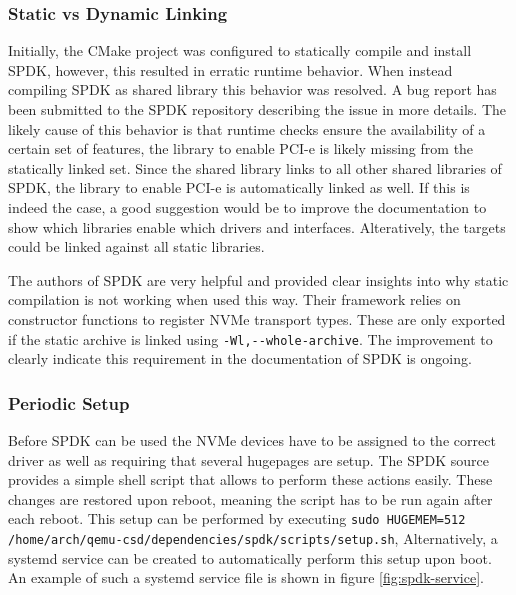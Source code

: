 \documentclass[conference]{IEEEtran}
\newcommand\bashstyle{
	\lstset{
		language=Bash,
		basicstyle=\ttm,
		showstringspaces=false,
		tabsize=2,
		aboveskip=0.2cm,
		belowskip=0.2cm,
		prebreak=\textbackslash,
		extendedchars=true,
		mathescape=false,
		linewidth=8.85cm,
		breaklines=true
	}
}
\newcommand\bashinline[1]{{\bashstyle\lstinline!#1!}}
\begin{document}

\subsubsection{Static vs Dynamic Linking}

Initially, the CMake project was configured to statically compile and install
SPDK, however, this resulted in erratic runtime behavior. When instead compiling
SPDK as shared library this behavior was resolved. A bug report has been
submitted to the SPDK repository describing the issue in more
details\cite{spdk-bug}. The likely cause of this behavior is that runtime checks
ensure the availability of a certain set of features, the library to enable
PCI-e is likely missing from the statically linked set. Since the shared
library links to all other shared libraries of SPDK, the library to enable
PCI-e is automatically linked as well. If this is indeed the case, a good
suggestion would be to improve the documentation to show which libraries enable
which drivers and interfaces. Alteratively, the targets could be linked against
all static libraries.

The authors of SPDK are very helpful and provided clear insights into why
static compilation is not working when used this way. Their framework relies on
constructor functions to register NVMe transport types. These are only exported
if the static archive is linked using\bashinline{-Wl,--whole-archive}. The
improvement to clearly indicate this requirement in the documentation of SPDK
is ongoing.

\subsubsection{Periodic Setup}

Before SPDK can be used the NVMe devices have to be assigned to the correct
driver as well as requiring that several hugepages are setup. The SPDK source
provides a simple shell script that allows to perform these actions easily.
These  changes are restored upon reboot, meaning the script has to be run again
after each reboot. This setup can be performed by
executing\bashinline{sudo HUGEMEM=512 /home/arch/qemu-csd/dependencies/spdk/scripts/setup.sh},
Alternatively, a systemd service can be created to automatically perform this
setup upon boot. An example of such a systemd service file is shown in
figure \ref{fig:spdk-service}.
\end{document}
